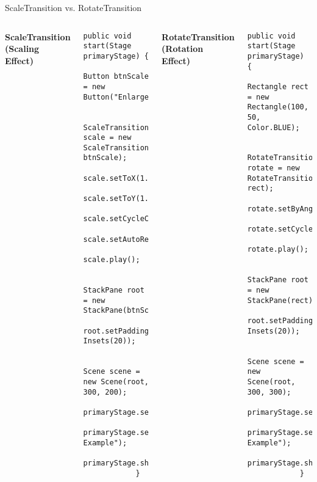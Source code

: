 \documentclass[aspectratio=169, table]{beamer}
\begin{document}
\begin{frame}[fragile]{ScaleTransition vs. RotateTransition}
	\vspace{30pt}
	\begin{columns}[t]
		\textbf{ScaleTransition (Scaling Effect)}  
		\begin{lstlisting}[style=JavaStyle]
			public void start(Stage primaryStage) {
				Button btnScale = new Button("Enlarge");
				
				ScaleTransition scale = new ScaleTransition(Duration.seconds(1), btnScale);
				scale.setToX(1.5);
				scale.setToY(1.5);
				scale.setCycleCount(Timeline.INDEFINITE);
				scale.setAutoReverse(true);
				scale.play();
				
				StackPane root = new StackPane(btnScale);
				root.setPadding(new Insets(20));
				
				Scene scene = new Scene(root, 300, 200);
				primaryStage.setScene(scene);
				primaryStage.setTitle("ScaleTransition Example");
				primaryStage.show();
			}
		\end{lstlisting}
		
		\textbf{RotateTransition (Rotation Effect)}  
		\begin{lstlisting}[style=JavaStyle]
			public void start(Stage primaryStage) {
				Rectangle rect = new Rectangle(100, 50, Color.BLUE);
				
				RotateTransition rotate = new RotateTransition(Duration.seconds(2), rect);
				rotate.setByAngle(360);
				rotate.setCycleCount(Timeline.INDEFINITE);
				rotate.play();
				
				StackPane root = new StackPane(rect);
				root.setPadding(new Insets(20));
				
				Scene scene = new Scene(root, 300, 300);
				primaryStage.setScene(scene);
				primaryStage.setTitle("RotateTransition Example");
				primaryStage.show();
			}
		\end{lstlisting}
	\end{columns}
\end{frame}
\end{document}
